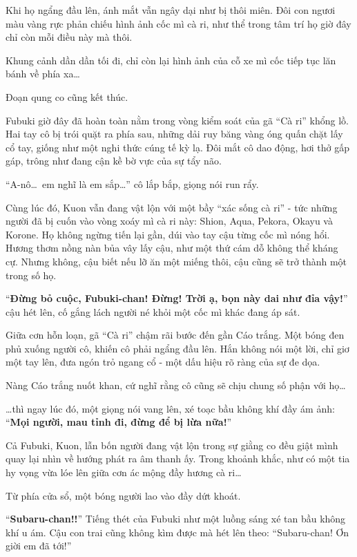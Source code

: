 \documentclass[../main.tex]{subfiles}
\begin{document}
Khi họ ngẩng đầu lên, ánh mắt vẫn ngây dại như bị thôi miên. Đôi con ngươi màu vàng rực phản chiếu hình ảnh cốc mì cà ri, như thể trong tâm trí họ giờ đây chỉ còn mỗi điều này mà thôi.

Khung cảnh dần dần tối đi, chỉ còn lại hình ảnh của cỗ xe mì cốc tiếp tục lăn bánh về phía xa\dots

Đoạn qung co cũng kết thúc.

\il

Fubuki giờ đây đã hoàn toàn nằm trong vòng kiểm soát của gã ``Cà ri'' khổng lồ. Hai tay cô bị trói quặt ra phía sau, những dải ruy băng vàng óng quấn chặt lấy cổ tay, giống như một nghi thức cúng tế kỳ lạ. Đôi mắt cô dao động, hơi thở gấp gáp, trông như đang cận kề bờ vực của sự tẩy não.


``A-nô\dots\ em nghĩ là em sắp\dots'' cô lắp bắp, giọng nói run rẩy.

Cùng lúc đó, Kuon vẫn đang vật lộn với một bầy ``xác sống cà ri'' - tức những người đã bị cuốn vào vòng xoáy mì cà ri này: Shion, Aqua, Pekora, Okayu và Korone. Họ không ngừng tiến lại gần, dúi vào tay cậu từng cốc mì nóng hổi. Hương thơm nồng nàn bủa vây lấy cậu, như một thứ cám dỗ không thể kháng cự. Nhưng không, cậu biết nếu lỡ ăn một miếng thôi, cậu cũng sẽ trở thành một trong số họ.

``\textbf{Đừng bỏ cuộc, Fubuki-chan! Đừng! Trời ạ, bọn này dai như đỉa vậy!}'' cậu hét lên, cố gắng lách người né khỏi một cốc mì khác đang áp sát.

Giữa cơn hỗn loạn, gã ``Cà ri'' chậm rãi bước đến gần Cáo trắng. Một bóng đen phủ xuống người cô, khiến cô phải ngẩng đầu lên. Hắn không nói một lời, chỉ giơ một tay lên, đưa ngón trỏ ngang cổ - một dấu hiệu rõ ràng của sự đe dọa.

Nàng Cáo trắng nuốt khan, cứ nghĩ rằng cô cũng sẽ chịu chung số phận với họ\dots

\dots thì ngay lúc đó, một giọng nói vang lên, xé toạc bầu không khí đầy ám ảnh: ``\textbf{Mọi người, mau tỉnh đi, đừng để bị lừa nữa!}''

Cả Fubuki, Kuon, lẫn bốn người đang vật lộn trong sự giằng co đều giật mình quay lại nhìn về hướng phát ra âm thanh ấy. Trong khoảnh khắc, như có một tia hy vọng vừa lóe lên giữa cơn ác mộng đầy hương cà ri\dots

Từ phía cửa sổ, một bóng người lao vào đầy dứt khoát.

``\textbf{Subaru-chan!!}'' Tiếng thét của Fubuki như một luồng sáng xé tan bầu không khí u ám. Cậu con trai cũng không kìm được mà hét lên theo: ``Subaru-chan! Ơn giời em đã tới!''
\end{document}
